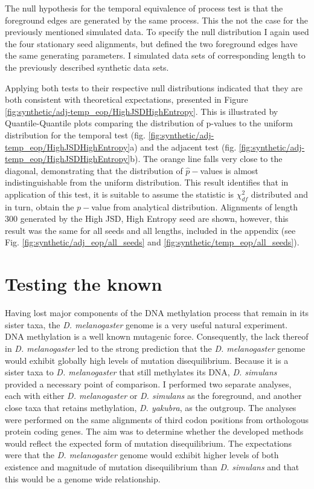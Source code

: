 The null hypothesis for the temporal equivalence of process test is that the foreground edges are generated by the same process. This the not the case for the previously mentioned simulated data. To specify the null distribution I again used the four stationary seed alignments, but defined the two foreground edges have the same generating parameters. I simulated data sets of corresponding length to the previously described synthetic data sets. 

Applying both tests to their respective null distributions indicated that they are both consistent with theoretical expectations, presented in Figure \ref{fig:synthetic/adj-temp_eop/HighJSDHighEntropy}. This is illustrated by Quantile-Quantile plots comparing the distribution of p-values to the uniform distribution for the temporal test (fig. \ref{fig:synthetic/adj-temp_eop/HighJSDHighEntropy}a) and the adjacent test (fig. \ref{fig:synthetic/adj-temp_eop/HighJSDHighEntropy}b). The orange line falls very close to the diagonal, demonstrating that the distribution of $\hat p-$values is almost indistinguishable from the uniform distribution.  This result identifies that in application of this test, it is suitable to assume the statistic is $\chi^2_{df}$ distributed and in turn, obtain the $p-$value from analytical distribution. Alignments of length 300 generated by the High JSD, High Entropy seed are shown, however, this result was the same for all seeds and all lengths, included in the appendix (see Fig. \ref{fig:synthetic/adj_eop/all_seeds} and \ref{fig:synthetic/temp_eop/all_seeds}).



\section{Testing the known}

Having lost major components of the DNA methylation process that remain in its sister taxa, the \textit{D. melanogaster} genome is a very useful natural experiment. DNA methylation is a well known mutagenic force. Consequently, the lack thereof in
\textit{D. melanogaster} led to the strong prediction that the \textit{D. melanogaster} genome would exhibit globally high levels of mutation disequilibrium. Because it is a sister taxa to \textit{D. melanogaster} that still methylates its DNA, \textit{D. simulans} provided a necessary point of comparison. I performed two separate analyses, each with either \textit{D. melanogaster} or \textit{D. simulans} as the foreground, and another close taxa that retains methylation, \textit{D. yakubra}, as the outgroup. The analyses were performed on the same alignments of third codon positions from orthologous protein coding genes. The aim was to determine whether the developed methods would reflect the expected form of mutation disequilibrium. The expectations were that the \textit{D. melanogaster} genome would exhibit higher levels of both existence and magnitude of mutation disequilibrium than \textit{D. simulans} and that this would be a genome wide relationship. 

